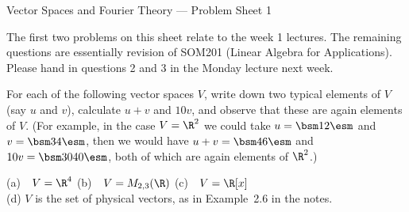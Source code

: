 


\begin{center}
 {\huge Vector Spaces and Fourier Theory ---
   Problem Sheet 1
 }
\end{center}

\begin{rubric}
The first two problems on this sheet relate to the week 1
lectures.  The remaining questions are essentially revision
of SOM201 (Linear Algebra for Applications).  Please hand in
questions 2 and 3 in the Monday lecture next week.
\end{rubric}

\begin{exercise}\label{ex-typical-elements}
 For each of the following vector spaces $V$, write down two
 typical elements of $V$ (say $u$ and $v$), calculate $u+v$
 and $10v$, and observe that these are again elements of
 $V$.  (For example, in the case $V=\R^2$ we could take
 $u=\bsm 1\\2\esm$ and $v=\bsm 3\\4\esm$, then we would have
 $u+v=\bsm 4\\6\esm$ and $10v=\bsm 30\\40\esm$, both of
 which are again elements of $\R^2$.)
 \begin{center}
  (a)~~$V=\R^4$  \hspace{3em}
  (b)~~$V=M_{2,3}(\R)$ \hspace{3em}
  (c)~~$V=\R[x]$ \\
  (d) $V$ is the set of physical vectors, as in
   Example~2.6 in the notes.
 \end{center}
\end{exercise}

